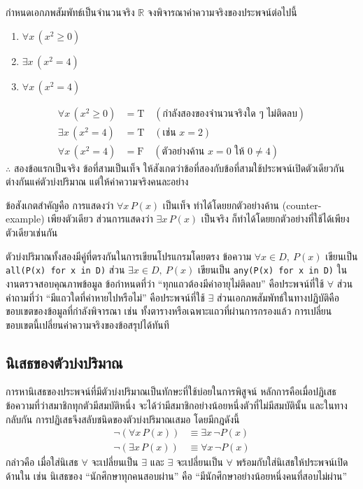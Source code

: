 \begin{ex}
\label{ex:interpret-quantifier}
กำหนดเอกภพสัมพัทธ์เป็นจำนวนจริง $\mathbb{R}$ จงพิจารณาค่าความจริงของประพจน์ต่อไปนี้
\begin{enumerate}
  \item $\forall x\, (x^2 \geq 0)$
  \item $\exists x\, (x^2 = 4)$
  \item $\forall x\, (x^2 = 4)$
\end{enumerate}
\end{ex}
\begin{solution}
\begin{align*}
\forall x\,(x^2 \geq 0) &= \text{T} \quad (\text{กำลังสองของจำนวนจริงใด ๆ ไม่ติดลบ})\\
\exists x\,(x^2 = 4) &= \text{T} \quad (\text{เช่น } x = 2)\\
\forall x\,(x^2 = 4) &= \text{F} \quad (\text{ตัวอย่างค้าน } x = 0 \text{ ให้ } 0 \neq 4)
\end{align*}
$\therefore$ สองข้อแรกเป็นจริง ข้อที่สามเป็นเท็จ ให้สังเกตว่าข้อที่สองกับข้อที่สามใช้ประพจน์เปิดตัวเดียวกัน ต่างกันแค่ตัวบ่งปริมาณ แต่ให้ค่าความจริงคนละอย่าง \solhere
\end{solution}

ข้อสังเกตสำคัญคือ การแสดงว่า $\forall x\,P(x)$ เป็นเท็จ ทำได้โดยยกตัวอย่างค้าน (counter-example) เพียงตัวเดียว ส่วนการแสดงว่า $\exists x\,P(x)$ เป็นจริง ก็ทำได้โดยยกตัวอย่างที่ใช้ได้เพียงตัวเดียวเช่นกัน

ตัวบ่งปริมาณทั้งสองมีคู่ที่ตรงกันในการเขียนโปรแกรมโดยตรง ข้อความ $\forall x \in D,\ P(x)$ เขียนเป็น \texttt{all(P(x) for x in D)} ส่วน $\exists x \in D,\ P(x)$ เขียนเป็น \texttt{any(P(x) for x in D)} ในงานตรวจสอบคุณภาพข้อมูล ข้อกำหนดที่ว่า ``ทุกแถวต้องมีค่าอายุไม่ติดลบ'' คือประพจน์ที่ใช้ $\forall$ ส่วนคำถามที่ว่า ``มีแถวใดที่ค่าหายไปหรือไม่'' คือประพจน์ที่ใช้ $\exists$ ส่วนเอกภพสัมพัทธ์ในทางปฏิบัติคือขอบเขตของข้อมูลที่กำลังพิจารณา เช่น ทั้งตารางหรือเฉพาะแถวที่ผ่านการกรองแล้ว การเปลี่ยนขอบเขตนี้เปลี่ยนค่าความจริงของข้อสรุปได้ทันที

\subsection{นิเสธของตัวบ่งปริมาณ}
การหานิเสธของประพจน์ที่มีตัวบ่งปริมาณเป็นทักษะที่ใช้บ่อยในการพิสูจน์ หลักการคือเมื่อปฏิเสธข้อความที่ว่าสมาชิกทุกตัวมีสมบัติหนึ่ง จะได้ว่ามีสมาชิกอย่างน้อยหนึ่งตัวที่ไม่มีสมบัตินั้น และในทางกลับกัน การปฏิเสธจึงสลับชนิดของตัวบ่งปริมาณเสมอ โดยมีกฎดังนี้~\parencite{enderton2001logic}
\begin{align*}
  \neg(\forall x\, P(x)) &\equiv \exists x\, \neg P(x) \\
  \neg(\exists x\, P(x)) &\equiv \forall x\, \neg P(x)
\end{align*}
กล่าวคือ เมื่อใส่นิเสธ $\forall$ จะเปลี่ยนเป็น $\exists$ และ $\exists$ จะเปลี่ยนเป็น $\forall$ พร้อมกับใส่นิเสธให้ประพจน์เปิดด้านใน เช่น นิเสธของ ``นักศึกษาทุกคนสอบผ่าน'' คือ ``มีนักศึกษาอย่างน้อยหนึ่งคนที่สอบไม่ผ่าน''


